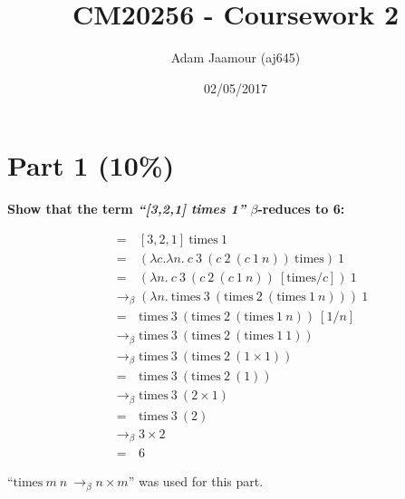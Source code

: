 \documentclass{article}
\title{CM20256 - Coursework 2}
\date{02/05/2017}
\author{Adam Jaamour (aj645)}
\begin{document}

	\newcommand{\lamb}{$\lambda$}
	\newcommand{\la}{\lambda}
	\newcommand{\be}{$\beta$}
	
	\newcommand{\sa}{\quad}
	\newcommand{\saq}{\, \, \, \,}	
	
	\newcommand{\equals}{\rightarrow_\beta}
	\newcommand{\equalsT}{\sa \rightarrow_\beta^*\sa}
	
	\newcommand{\tim}{\text{times}}
	
	
	
	\maketitle
	\newpage
	
	\begin{Large}
		\tableofcontents
	\end{Large}
	\newpage
	
	\pagenumbering{arabic}
	
	
	\section{Part 1 (10\%)}

	\begin{Large}
	
		\textbf{Show that the term \textit{``[3,2,1] times 1''} $\beta$-reduces to 6:}
		
		\begin{align*}
			&= \saq [3,2,1] \ \tim \ 1 \\
			&= \saq (\la c. \la n . \ c \ 3 \ (c \ 2 \ (c \ 1 \ n)) \ \tim ) \ 1 \\
			&= \saq (\la n . \ c \ 3 \ (c \ 2 \ (c \ 1 \ n)) \ [\tim /c ]) \ 1 \\
			&\equals (\la n . \ \tim \ 3 \ (\tim \ 2 \ (\tim \ 1 \ n))) \ 1 \\
			&= \saq \tim \ 3 \ (\tim \ 2 \ (\tim \ 1 \ n)) \ [1/n] \\
			&\equals \tim \ 3 \ (\tim \ 2 \ (\tim \ 1 \ 1)) \\
			&\equals \tim \ 3 \ (\tim \ 2 \ (1 \times 1)) \\
			&= \saq \tim \ 3 \ (\tim \ 2 \ (1)) \\
			&\equals \tim \ 3 \ (2 \times 1) \\
			&= \saq \tim \ 3 \ (2) \\
			&\equals 3 \times 2 \\
			&= \saq 6
		\end{align*}
		\newline
		
		``$\tim \ m \ n \ \equals n \times m$'' was used for this part.
		
	\end{Large}
	\newpage
	
\end{document}
